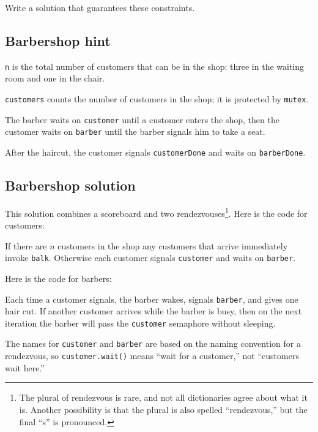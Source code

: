 \documentclass{book}
\newcommand{\clearemptydoublepage}{\newpage\cleardoublepage}
\begin{document}
Write a solution that guarantees these constraints.


\clearemptydoublepage
\subsection{Barbershop hint}



{\tt n} is the total number of customers that can be in the shop:
three in the waiting room and one in the chair.

{\tt customers} counts the number of customers in the shop;
it is protected by {\tt mutex}.

The barber waits on {\tt customer} until a customer enters the
shop, then the customer waits on {\tt barber} until the barber
signals him to take a seat.

After the haircut, the customer signals {\tt customerDone} and
waits on {\tt barberDone}.

\clearemptydoublepage
\subsection{Barbershop solution}

This solution combines a scoreboard and two rendezvouses\footnote{The
  plural of rendezvous is rare, and not all dictionaries agree about
  what it is.  Another possibility is that the plural is also spelled
  ``rendezvous,'' but the final ``s'' is pronounced.}.  Here is the
code for customers:



If there are $n$ customers in the shop any customers that
arrive immediately invoke {\tt balk}.
Otherwise each customer signals {\tt customer} and waits on
{\tt barber}.

Here is the code for barbers:



Each time a customer signals,
the barber wakes, signals {\tt barber}, and gives one
hair cut.  If another customer arrives while the barber
is busy, then on the next iteration the barber will pass
the {\tt customer} semaphore without sleeping.

The names for {\tt customer} and {\tt barber} are based on
the naming convention for a rendezvous, so {\tt customer.wait()}
means ``wait for a customer,'' not ``customers wait here.''
\end{document}
